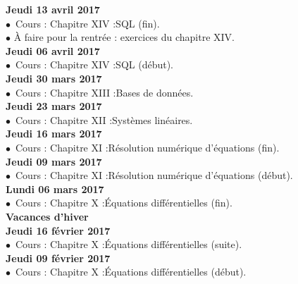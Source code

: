 \documentclass[12pt,a4paper]{article}
\begin{document}
\noindent\textbf{\bf Jeudi 13 avril 2017 \rm}\\
$\bullet$\ Cours : Chapitre XIV :\rm SQL (fin).\\
$\bullet$ À faire pour la rentrée : exercices du chapitre XIV.
\vspace{.4cm}\\

\noindent\textbf{\bf Jeudi 06 avril 2017 \rm}\\
$\bullet$\ Cours : Chapitre XIV :\rm SQL (début).
\vspace{.4cm}\\

\noindent\textbf{\bf Jeudi 30 mars 2017 \rm}\\
$\bullet$\ Cours : Chapitre XIII :\rm Bases de données.
\vspace{.4cm}\\

\noindent\textbf{\bf Jeudi 23 mars 2017 \rm}\\
$\bullet$\ Cours : Chapitre XII :\rm Systèmes linéaires.
\vspace{.4cm}\\

\noindent\textbf{\bf Jeudi 16 mars 2017 \rm}\\
$\bullet$\ Cours : Chapitre XI :\rm Résolution numérique d'équations (fin).
\vspace{.4cm}\\

\noindent\textbf{\bf Jeudi 09 mars 2017 \rm}\\
$\bullet$\ Cours : Chapitre XI :\rm Résolution numérique d'équations (début).
\vspace{.4cm}\\

\noindent\textbf{\bf Lundi 06 mars 2017 \rm}\\
$\bullet$\ Cours : Chapitre X :\rm Équations différentielles (fin).
\vspace{.4cm}\\

\noindent\textbf{\bf Vacances d'hiver\vspace{.4cm} }\\

\noindent\textbf{\bf Jeudi 16 février 2017 \rm}\\
$\bullet$\ Cours : Chapitre X :\rm Équations différentielles (suite).
\vspace{.4cm}\\

\noindent\textbf{\bf Jeudi 09 février 2017 \rm}\\
$\bullet$\ Cours : Chapitre X :\rm Équations différentielles (début).
\vspace{.4cm}\\
\end{document}
